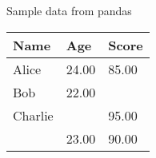 \caption{Sample data from pandas}
\label{tab:sample_data}
\begin{tabular}{lll}
\toprule
Name & Age & Score \\
\midrule
Alice & 24.00 & 85.00 \\
Bob & 22.00 &  \\
Charlie &  & 95.00 \\
 & 23.00 & 90.00 \\
\bottomrule
\end{tabular}

